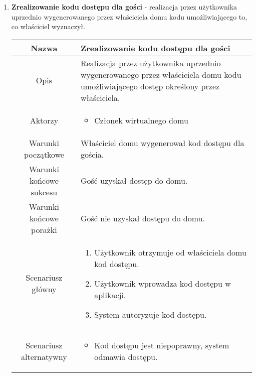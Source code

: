 \documentclass{article}
\begin{document}
\begin{enumerate}
\begin{enumerate}
			\item \textbf{Zrealizowanie kodu dostępu dla gości} - realizacja przez
				użytkownika uprzednio wygenerowanego przez właściciela domu kodu
				umożliwiającego to, co właściciel wyznaczył.
				\begin{table}[H]
					\centering
					\begin{tabular}{|c|p{7cm}|}
						\hline
						Nazwa                   & \textbf{Zrealizowanie kodu dostępu dla gości}                                                                                                                                          \\
						\hline
						Opis                    & Realizacja przez użytkownika uprzednio wygenerowanego przez właściciela domu kodu umożliwiającego dostęp określony przez właściciela.                                                  \\
						\hline
						Aktorzy                 & \begin{itemize}\item Członek wirtualnego domu\end{itemize}                                                                                                                             \\
						\hline
						Warunki początkowe      & Właściciel domu wygenerował kod dostępu dla gościa.                                                                                                                                    \\
						\hline
						Warunki końcowe sukcesu & Gość uzyskał dostęp do domu.                                                                                                                                                           \\
						\hline
						Warunki końcowe porażki & Gość nie uzyskał dostępu do domu.                                                                                                                                                      \\
						\hline
						Scenariusz główny       & \begin{enumerate}\item Użytkownik otrzymuje od właściciela domu kod dostępu.

\item Użytkownik wprowadza kod dostępu w aplikacji.

\item System autoryzuje kod dostępu.\end{enumerate} \\
						\hline
						Scenariusz alternatywny & \begin{itemize}\item Kod dostępu jest niepoprawny, system odmawia dostępu.\end{itemize}                                                                                                \\
						\hline
					\end{tabular}
				\end{table}


\end{enumerate}
\end{enumerate}
\end{document}
